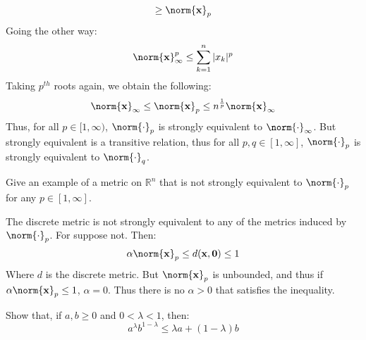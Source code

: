 \documentclass[crop=false,class=article,oneside]{standalone}
\begin{document}
\begin{solution}
\begin{equation}
            \geq\norm{\mathbf{x}}_{p}
        \end{equation}
        Going the other way:
        \begin{equation}
            \norm{\mathbf{x}}_{\infty}^{p}\leq
            \sum_{k=1}^{n}|x_{k}|^{p}
        \end{equation}
        Taking $p^{th}$ roots again, we obtain the following:
        \begin{equation}
            \norm{\mathbf{x}}_{\infty}\leq\norm{\mathbf{x}}_{p}
            \leq{n}^{\frac{1}{p}}\norm{\mathbf{x}}_{\infty}
        \end{equation}
        Thus, for all $p\in[1,\infty)$, $\norm{\cdot}_{p}$ is strongly
        equivalent to $\norm{\cdot}_{\infty}$. But strongly equivalent
        is a transitive relation, thus for all
        $p,q\in[1,\infty]$, $\norm{\cdot}_{p}$ is strongly equivalent to
        $\norm{\cdot}_{q}$.
    \end{solution}
    \begin{problem}
        Give an example of a metric on $\mathbb{R}^{n}$ that is not
        strongly equivalent to $\norm{\cdot}_{p}$ for any
        $p\in[1,\infty]$.
    \end{problem}
    \begin{solution}
        The discrete metric is not strongly equivalent to any of the
        metrics induced by $\norm{\cdot}_{p}$. For suppose not. Then:
        \begin{equation}
            \alpha\norm{\mathbf{x}}_{p}\leq
            d(\mathbf{x},\mathbf{0})\leq{1}
        \end{equation}
        Where $d$ is the discrete metric. But $\norm{\mathbf{x}}_{p}$
        is unbounded, and thus if $\alpha\norm{\mathbf{x}}_{p}\leq{1}$,
        $\alpha=0$. Thus there is no $\alpha>0$ that satisfies the
        inequality.
    \end{solution}
    \begin{problem}
        Show that, if $a,b\geq{0}$ and $0<\lambda<1$, then:
        \begin{equation}
            a^{\lambda}b^{1-\lambda}\leq\lambda{a}+(1-\lambda)b
        \end{equation}
    \end{problem}
\end{document}
